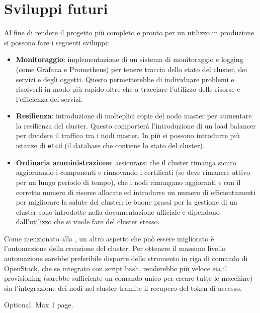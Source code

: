 \documentclass[12pt,a4paper,openright,twoside]{book}
\begin{document}
\section{Sviluppi futuri}
\label{sec:future}
Al fine di rendere il progetto più completo e pronto per un utilizzo in produzione si possono fare i seguenti sviluppi:
\begin{itemize}
    \item {\textbf{Monitoraggio}: implementazione di un sistema di monitoraggio e logging (come Grafana e Prometheus) per tenere traccia dello stato del cluster, dei servizi e degli oggetti.
    Questo permetterebbe di individuare problemi e risolverli in modo più rapido oltre che a tracciare l'utilizzo delle risorse e l'efficienza dei servizi.
    }
    \item{
        \textbf{Resilienza}: introduzione di molteplici copie del nodo master per aumentare la resilienza del cluster. Questo comporterà l'introduzione di un load balancer per dividere il traffico tra i nodi master.
        In più si possono introdurre più istanze di \texttt{etcd} (il database che contiene lo stato del cluster)\cite{kubernetes}.
    }
    \item {
        \textbf{Ordinaria amministrazione}: assicurarsi che il cluster rimanga sicuro aggiornando i componenti e rinnovando i certificati (se deve rimanere
        attivo per un lungo periodo di tempo), che i nodi rimangano aggiornati e con il corretto numero di risorse allocate ed introdurre un numero di efficientamenti
        per migliorare la salute del cluster; le buone prassi per la gestione di un cluster sono introdotte nella documentazione ufficiale e dipendono dall'utilizzo che
        si vuole fare del cluster stesso\cite{kubernetes}.
    }
\end{itemize}
Come menzionato alla , un altro aspetto che può essere migliorato è l'automazione della creazione del cluster.
Per ottenere il massimo livello automazione sarebbe preferibile disporre dello strumento in riga di comando di OpenStack, che se integrato con script bash, renderebbe 
più veloce sia il provisioning (sarebbe sufficiente un comando unico per creare tutte le macchine) sia l'integrazione dei nodi nel cluster tramite il recupero del token di accesso.


\backmatter

\nocite{*} %




\begin{acknowledgements} %
Optional. Max 1 page.
\end{acknowledgements}
\end{document}
